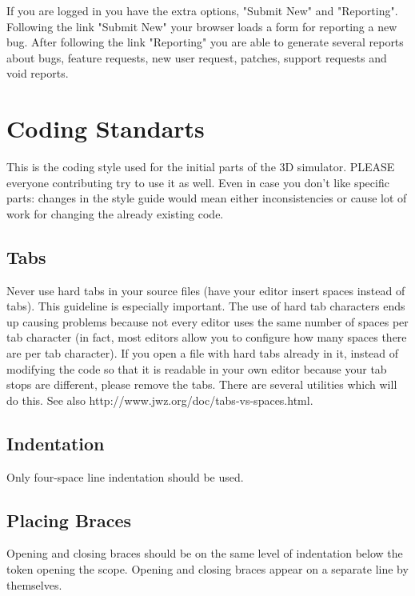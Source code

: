 If you are logged in you have the extra options, "Submit New" and "Reporting".
Following the link "Submit New" your browser loads a form for reporting a new bug.
After following the link "Reporting" you are able to generate several reports about
bugs, feature requests, new user request, patches, support requests and void reports.

\section{Coding Standarts}

This is the coding style used for the initial parts of the 3D simulator. PLEASE everyone contributing try to use it as well. Even in case you don't like specific parts: changes in the style guide would mean either inconsistencies or cause lot of work for changing the already existing code. 

\subsection{Tabs}

Never use hard tabs in your source files (have your editor insert spaces instead of tabs). This guideline is especially important. The use of hard tab characters ends up causing problems because not every editor uses the same number of spaces per tab character (in fact, most editors allow you to configure how many spaces there are per tab character). If you open a file with hard tabs already in it, instead of modifying the code so that it is readable in your own editor because your tab stops are different, please remove the tabs. There are several utilities which will do this. See also http://www.jwz.org/doc/tabs-vs-spaces.html.

\subsection{Indentation}

Only four-space line indentation should be used. 

\subsection{Placing Braces}

Opening and closing braces should be on the same level of
indentation below the token opening the scope. Opening and closing
braces appear on a separate line by themselves.
\\

